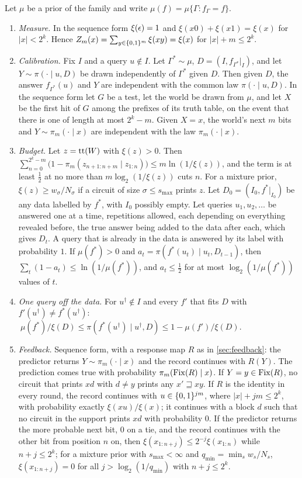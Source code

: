 \begin{theorem}\label{thm:c-transfer}
Let $\mu$ be a prior of the family and write $\mu(f)=\mu\{\Gamma:f_\Gamma=f\}$.
\begin{enumerate}[label=(\alph*),leftmargin=2em,itemsep=2pt,topsep=2pt]
\item \emph{Measure.} In the sequence form $\xi(\epsilon)=1$ and $\xi(x0)+\xi(x1)=\xi(x)$ for $|x|<2^k$. Hence
$Z_m(x)=\sum_{y\in\{0,1\}^m}\xi(xy)=\xi(x)$ for $|x|+m\le2^k$.
\item \emph{Calibration.} Fix $I$ and a query $u\notin I$. Let $\Gamma^*\sim\mu$, $D=(I,f_{\Gamma^*}|_I)$, and
let $Y\sim\pi(\cdot\mid u,D)$ be drawn independently of $\Gamma^*$ given $D$. Then given $D$, the answer
$f_{\Gamma^*}(u)$ and $Y$ are independent with the common law $\pi(\cdot\mid u,D)$. In the sequence form let
$G$ be a test, let the world be drawn from $\mu$, and let $X$ be the first hit of $G$ among the prefixes of
its truth table, on the event that there is one of length at most $2^k-m$. Given $X=x$, the world's next $m$
bits and $Y\sim\pi_m(\cdot\mid x)$ are independent with the law $\pi_m(\cdot\mid x)$.
\item \emph{Budget.} Let $z=\mathrm{tt}(W)$ with $\xi(z)>0$. Then
$\sum_{n=0}^{2^k-m}\bigl(1-\pi_m(z_{n+1:n+m}\mid z_{1:n})\bigr)\le m\ln(1/\xi(z))$, and the term is at least
$\frac12$ at no more than $m\log_2(1/\xi(z))$ cuts $n$. For a mixture prior, $\xi(z)\ge w_\sigma/N_\sigma$ if
a circuit of size $\sigma\le s_{\max}$ prints $z$. Let $D_0=(I_0,f^*|_{I_0})$ be any data labelled by $f^*$,
with $I_0$ possibly empty. Let queries $u_1,u_2,\dots$ be answered one at a time, repetitions allowed, each
depending on everything revealed before, the true answer being added to the data after each, which gives
$D_t$. A query that is already in the data is answered by its label with probability $1$. If $\mu(f^*)>0$ and
$a_t=\pi(f^*(u_t)\mid u_t,D_{t-1})$, then $\sum_t(1-a_t)\le\ln(1/\mu(f^*))$, and $a_t\le\frac12$ for at most
$\log_2(1/\mu(f^*))$ values of $t$.
\item \emph{One query off the data.} For $u^\dagger\notin I$ and every $f'$ that fits $D$ with
$f'(u^\dagger)\ne f^*(u^\dagger)$:
$\ \mu(f^*)/\xi(D)\le\pi(f^*(u^\dagger)\mid u^\dagger,D)\le1-\mu(f')/\xi(D)$.
\item \emph{Feedback.} Sequence form, with a response map $R$ as in \cref{sec:feedback}: the predictor returns
$Y\sim\pi_m(\cdot\mid x)$ and the record continues with $R(Y)$. The prediction comes true with probability
$\pi_m(\mathrm{Fix}(R)\mid x)$. If $Y=y\in\mathrm{Fix}(R)$, no circuit that prints $xd$ with $d\ne y$ prints any
$x'\sqsupseteq xy$. If $R$ is the identity in every round, the record continues with $u\in\{0,1\}^{jm}$, where
$|x|+jm\le2^k$, with probability exactly $\xi(xu)/\xi(x)$; it continues with a block $d$ such that no circuit
in the support prints $xd$ with probability $0$. If the predictor returns the more probable next bit, $0$ on a
tie, and the record continues with the other bit from position $n$ on, then
$\xi(x_{1:n+j})\le2^{-j}\xi(x_{1:n})$ while $n+j\le2^k$; for a mixture prior with $s_{\max}<\infty$ and
$q_{\min}=\min_sw_s/N_s$, $\xi(x_{1:n+j})=0$ for all $j>\log_2(1/q_{\min})$ with $n+j\le2^k$.
\end{enumerate}
\end{theorem}
